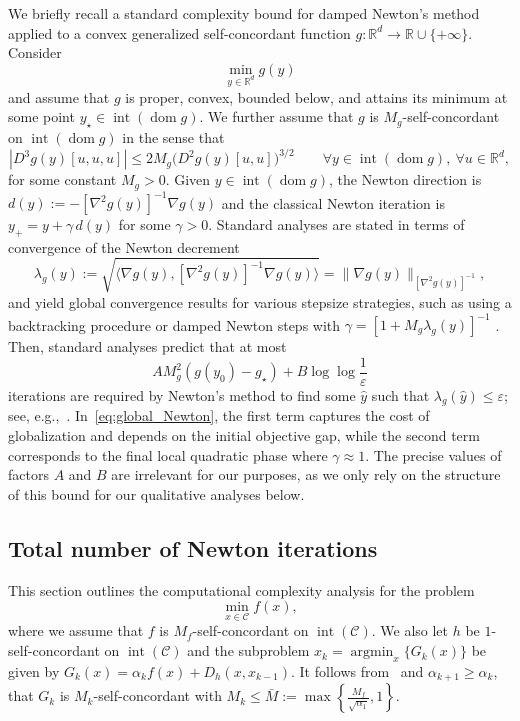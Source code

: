 \documentclass[a4paper]{article}
\renewcommand{\leq}{\leqslant}
\renewcommand{\geq}{\geqslant}
\newcommand{\CC}{\mathcal{C}}
\newcommand{\coloneqq}{:=}
\newcommand{\R}{\mathbb{R}}
\newcommand{\ip}[2]{\langle #1, #2\rangle}
\renewcommand{\epsilon}{\varepsilon}
\DeclareMathOperator*{\argmin}{argmin}
\DeclareMathOperator{\dom}{dom}
\DeclareMathOperator{\inter}{int}
\begin{document}
We briefly recall a standard complexity bound for damped Newton's method applied to a convex generalized self-concordant function $g:\R^d\to \R\cup\{+\infty\}$.
Consider
\[
\min_{y\in \R^d} g(y)
\]
and assume that $g$ is proper, convex, bounded below, and attains its minimum at some point $y_\star\in \inter(\dom g)$.
We further assume that $g$ is $M_g$-self-concordant on $\inter(\dom g)$ in the sense that
\[
|D^3 g(y)[u,u,u]|
\le
2 M_g \bigl(D^2 g(y)[u,u]\bigr)^{3/2}
\qquad
\forall y\in \inter(\dom g),\ \forall u\in \R^d,
\]
for some constant $M_g>0$.
Given $y\in \inter(\dom g)$, the Newton direction is $d(y)\coloneqq -[\nabla^2 g(y)]^{-1}\nabla g(y)$ and the classical Newton iteration is $y_+=y+\gamma\,d(y)$ for some $\gamma>0$.
Standard analyses are stated in terms of convergence of the Newton decrement \[\lambda_g(y)\coloneqq \sqrt{\ip{\nabla g(y)}{[\nabla^2 g(y)]^{-1}\nabla g(y)}}=\|\nabla g(y)\|_{[\nabla^2 g(y)]^{-1}},\]
and yield global convergence results for various stepsize strategies, such as using a backtracking procedure or damped Newton steps with $\gamma=[1+M_g\lambda_g(y)]^{-1}$ \cite{nemirovski2008interior,nesterov2018lectures}.
Then, standard analyses predict that at most
\begin{equation}\label{eq:global_Newton}
        AM^2_g (g(y_0)-g_\star) + B \log\log\frac1\epsilon 
\end{equation}
iterations are required by Newton's method to find some $\hat{y}$ such that $\lambda_g(\hat y)\leq \epsilon$; see, e.g.,~\cite[Eq. (5.2.11)]{nesterov2018lectures}.
In~\eqref{eq:global_Newton}, the first term captures the cost of globalization and depends on the initial objective gap, while the second term corresponds to the final local quadratic phase where $\gamma\approx 1$.
The precise values of factors $A$ and $B$ are irrelevant for our purposes, as we only rely on the structure of this bound for our qualitative analyses below. 

\subsection{Total number of Newton iterations}
This section outlines the computational complexity analysis for the problem 
\[
\min_{x\in\CC} f(x),
\]
where we assume that $f$ is $M_f$-self-concordant on $\inter(\CC)$. We also let $h$ be $1$-self-concordant on $\inter(\CC)$ and the subproblem $x_{k}=\argmin_x\{ G_k(x)\}$ be given by $G_k(x)=\alpha_k f(x)+D_h(x,x_{k-1})$. It follows from~\cite[Theorem 5.1.1]{nesterov2018lectures} and $\alpha_{k+1}\geq \alpha_k$, that $G_k$ is $M_k$-self-concordant with $M_k\leq \bar{M}\coloneqq \max\left\{\frac{M_f}{\sqrt{\alpha_1}},1\right\}$.
\end{document}
